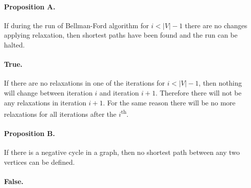 \documentclass{article}
\begin{document}
\paragraph{Proposition A.} If during the run of Bellman-Ford algorithm for \(i < |V| - 1\) there are no changes applying relaxation, then shortest paths have been found and the run can be halted.

\paragraph{True.} If there are no relaxations in one of the iterations for \(i < |V| - 1\), then nothing will change between iteration \(i\) and iteration \(i+1\). Therefore there will not be any relaxations in iteration \(i+1\). For the same reason there will be no more relaxations for all iterations after the \(i\)\textsuperscript{th}.

\paragraph{Proposition B.} If there is a negative cycle in a graph, then no shortest path between any two vertices can be defined.

\paragraph{False.}
\end{document}
